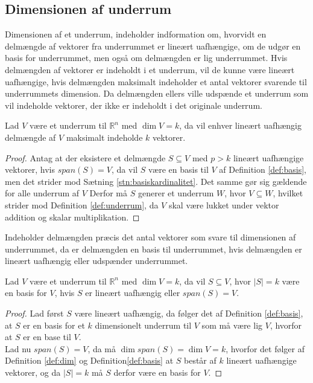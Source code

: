 \subsection{Dimensionen af underrum}
Dimensionen af et underrum, indeholder indformation om, hvorvidt en delmængde af vektorer fra underrummet er lineært uafhængige, om de udgør en basis for underrummet, men også om delmængden er lig underrummet.
Hvis delmængden af vektorer er indeholdt i et underrum, vil de kunne være lineært uafhængige, hvis delmængden maksimalt indeholder et antal vektorer svarende til underrummets dimension. 
Da delmængden ellers ville udspænde et underrum som vil indeholde vektorer, der ikke er indeholdt i det originale underrum.
\begin{kor}
Lad $V$ være et underrum til $\mathds{R}^n$ med $\dim{V}=k$, da vil enhver lineært uafhængig delmængde af $V$ maksimalt indeholde $k$ vektorer.
\label{kor:linearuafhangighedunderrum}
\end{kor}
\begin{proof}
Antag at der eksistere et delmængde $S \subseteq V$ med $p > k$ lineært uafhængige vektorer, hvis $span(S) = V$, da vil $S$ være en basis til $V$ af Definition \ref{def:basis}, men det strider mod Sætning \ref{stn:basiskardinalitet}. Det samme gør sig gældende for alle underrum af $V$
Derfor må $S$ generer et underrum $W$, hvor $V \subseteq W$, hvilket strider mod Definition \ref{def:underrum}, da $V$ skal være lukket under vektor addition og skalar multiplikation.
\end{proof}
Indeholder delmængden præcis det antal vektorer som svare til dimensionen af underrummet, da er delmængden en basis til underrummet, hvis delmængden er lineært uafhængig eller udspænder underrummet.
\begin{kor}
Lad $V$ være et underrum til $\mathds{R}^n$ med $\dim{V}=k$, da vil $S \subseteq V$, hvor $|S|=k$ være en basis for $V$, hvis $S$ er lineært uafhængig eller $span(S) = V$.
\label{kor:serbase}
\end{kor}
\begin{proof}
Lad først $S$ være lineært uafhængig, da følger det af Definition \ref{def:basis}, at $S$ er en basis for et $k$ dimensionelt underrum til $V$ som må være lig $V$, hvorfor at $S$ er en base til $V$.
\\Lad nu $span(S) = V$, da må $\dim{span(S)} = \dim{V} = k$, hvorfor det følger af Definition \ref{def:dim} og Definition\ref{def:basis} at $S$ består af $k$ lineært uafhængige vektorer, og da $|S|=k$ må $S$ derfor være en basis for $V$.
\end{proof}
